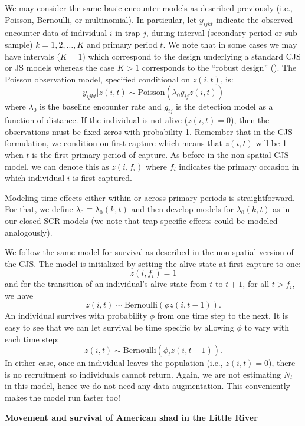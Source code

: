 We may consider the same basic encounter
models as described previously (i.e., Poisson, Bernoulli, or
multinomial). In particular, let $y_{ijkt}$ indicate the observed
encounter data of individual $i$ in trap $j$, during interval
(secondary period or sub-sample) $k=1,2,\ldots,K$ and primary period $t$. We note that in
some cases we may have intervals ($K=1$) which correspond to the
design underlying a standard CJS or JS models whereas the case $K>1$
corresponds to the ``robust design'' (\citealt{pollock:1982}).  The
Poisson observation model, specified conditional on $z(i,t)$, is:
 \[
  y_{ijkt}|z(i,t) \sim  \mbox{Poisson}(\lambda_0 g_{ij} z(i,t))
\]
where $\lambda_{0}$ is the baseline encounter rate and $g_{ij}$ is the
detection model as a function of distance.  If the individual is not
alive ($z(i,t)=0$), then the observations must be fixed zeros with
probability 1.  Remember that in the CJS formulation, we condition on
first capture which means that $z(i,t)$ will be 1 when $t$ is the
first primary period of capture.  As before in the non-spatial CJS
model, we can denote this as $z(i, f_i)$ where $f_i$ indicates the
primary occasion in which individual $i$ is first captured.

Modeling time-effects either within or across primary periods is
straightforward. For that, we define $\lambda_{0} \equiv
\lambda_{0}(k,t)$ and then develop models for $\lambda_{0}(k,t)$ as in
our closed SCR models (we note that trap-specific effects could be
modeled analogously).

We follow the same model for survival as described in the non-spatial
version of the CJS.  The model is initialized by setting the alive
state at first capture to one:
\[
 z(i,f_i) = 1
\]
and for the transition of an individual's alive state from $t$ to
$t+1$, for all $t > f_i$, we have
\[
z(i,t) \sim \mbox{Bernoulli}( \phi z(i,t-1)).
\]
An individual survives with probability $\phi$ from one time step to
the next.  It is easy to see that we can let survival be time specific
by allowing $\phi$ to vary with each time step:
\[
 z(i,t) \sim \mbox{Bernoulli}( \phi_t z(i,t-1)).
\]
In either case, once an individual leaves the population (i.e.,
$z(i,t)=0$), there is no recruitment so individuals cannot return.
Again, we are not estimating $N_t$ in this model, hence we do not need
any data augmentation.  This conveniently makes the model run faster
too!

{\flushleft \bf Movement and survival of American shad in the Little River}

